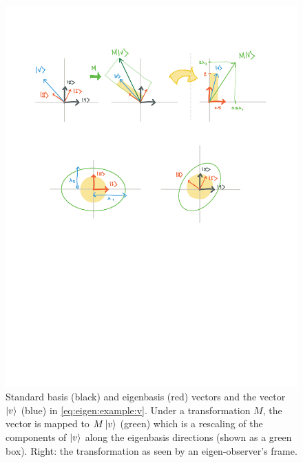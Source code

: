 \documentclass[12pt]{article}
\begin{document}
\begin{figure}[tb]
    \centering
    \includegraphics[width=.8\textwidth]{figures/eigen_transform.pdf}
    \caption{Standard basis (black) and eigenbasis (red) vectors and the vector $\left|v\right\rangle$ (blue) in \eqref{eq:eigen:example:v}. Under a transformation $M$, the vector is mapped to $M\left|v\right\rangle$ (green) which is a rescaling of the components of $\left|v\right\rangle$ along the eigenbasis directions (shown as a green box). Right: the transformation as seen by an eigen-observer's frame.}
    \label{fig:eigentransform}
\end{figure}
\end{document}
